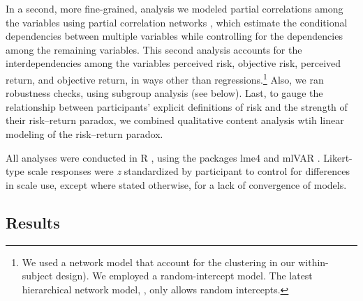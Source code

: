 \documentclass[a4paper,man, natbib,floatsintext]{apa6} %
\begin{document}
In a second, more fine-grained, analysis we modeled partial correlations among the variables using partial correlation networks \citep[e.g.,][]{Epskamp2019}, which estimate the conditional dependencies between multiple variables while controlling for the dependencies among the remaining variables. This second analysis accounts for the interdependencies among the variables perceived risk, objective risk, perceived return, and objective return, in ways other than regressions.\footnote{We used a network model that account for the clustering in our within-subject design). We employed a random-intercept model. The latest hierarchical network model, \citep[v0.4.3;][]{Epskamp2019}, only allows random intercepts.} Also, we ran robustness checks, using subgroup analysis (see below). Last, to gauge the relationship between participants' explicit definitions of risk and the strength of their risk--return paradox, we combined qualitative content analysis wtih linear modeling of the risk--return paradox.

All analyses were conducted in R \citep[v3.6.1;][]{R}, using the packages lme4 \citep[v1.1;][]{Bates2015} and mlVAR \citep[v0.4.3;][]{Epskamp2019}. Likert-type scale responses were \textit{z} standardized by participant to control for differences in scale use, except where stated otherwise, for a lack of convergence of models.

\subsection{Results}
\end{document}
